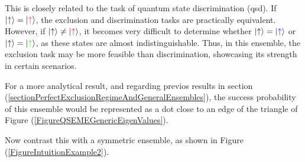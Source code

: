 \documentclass[12pt,letterpaper]{article}
\begin{document}
This is closely related to the task of quantum state discrimination (\gls{qsd}). If $\ket{\uparrow} = \ket{\textcolor{red}{\uparrow}}$, the exclusion and discrimination tasks are practically equivalent. However, if $\ket{\uparrow} \neq \ket{\textcolor{red}{\uparrow}}$, it becomes very difficult to determine whether $\ket{\uparrow} = \ket{\textcolor{blue}{\uparrow}}$ or $\ket{\uparrow} = \ket{\textcolor{green}{\uparrow}}$, as these states are almost indistinguishable. Thus, in this ensemble, the exclusion task may be more feasible than discrimination, showcasing its strength in certain scenarios.

For a more analytical result, and regarding previos results in section (\ref{sectionPerfectExclusionRegimeAndGeneralEnsembles}), the success probability of this ensemble would be represented as a dot close to an edge of the triangle of Figure (\ref{FigureQSEMEGenericEigenValues}).

Now contrast this with a symmetric ensemble, as shown in Figure (\ref{FigureIntuitionExample2}).
\end{document}
